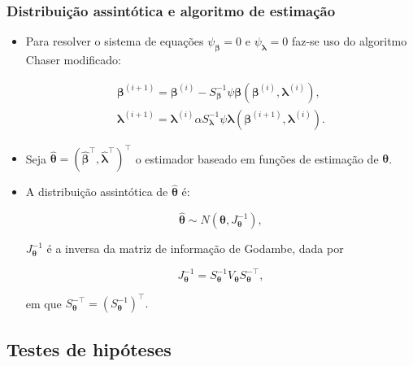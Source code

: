 \documentclass[10pt,
  aspectratio=169,
  serif,
  mathserif,
  professionalfont,
  compress,
  handout,
  ]{beamer}\usepackage[]{graphicx}\usepackage[]{color}
\begin{document}

\begin{frame}

\frametitle{Distribuição assintótica e algoritmo de estimação}

\begin{itemize}

  \item Para resolver o sistema de equações $\psi_{\boldsymbol{\beta}} = 0$ e $\psi_{\boldsymbol{\lambda}} = 0$ faz-se uso do algoritmo Chaser modificado:

$$
\begin{matrix}
\boldsymbol{\beta}^{(i+1)} = \boldsymbol{\beta}^{(i)}- S_{\boldsymbol{\beta}}^{-1} \psi \boldsymbol{\beta} (\boldsymbol{\beta}^{(i)}, \boldsymbol{\lambda}^{(i)}), \\ 
\boldsymbol{\lambda}^{(i+1)} = \boldsymbol{\lambda}^{(i)}\alpha S_{\boldsymbol{\lambda}}^{-1} \psi \boldsymbol{\lambda} (\boldsymbol{\beta}^{(i+1)}, \boldsymbol{\lambda}^{(i)}).
\end{matrix}
$$

  \item Seja $\boldsymbol{\hat{\theta}} = (\boldsymbol{\hat{\beta}^{\top}}, \boldsymbol{\hat{\lambda}^{\top}})^{\top}$ o estimador baseado em funções de estimação de $\boldsymbol{\theta}$.
  
  \item A distribuição assintótica de $\boldsymbol{\hat{\theta}}$ é:

$$
\boldsymbol{\hat{\theta}} \sim N(\boldsymbol{\theta}, J_{\boldsymbol{\theta}}^{-1}),
$$

\noindent $J_{\boldsymbol{\theta}}^{-1}$ é a inversa da matriz de informação de Godambe, dada por
  
$$J_{\boldsymbol{\theta}}^{-1} = S_{\boldsymbol{\theta}}^{-1} V_{\boldsymbol{\theta}} S_{\boldsymbol{\theta}}^{-\top},$$ 

\noindent em que $S_{\boldsymbol{\theta}}^{-\top} = (S_{\boldsymbol{\theta}}^{-1})^{\top}.$

\end{itemize}

\end{frame}


\subsection{Testes de hipóteses}
\end{document}
